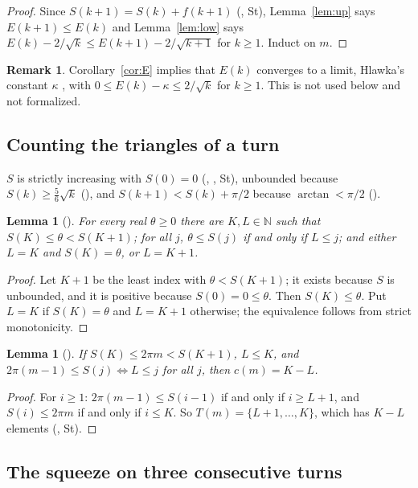 \documentclass[11pt]{amsart}
\theoremstyle{plain}
\newtheorem{lemma}[theorem]{Lemma}
\theoremstyle{definition}
\newtheorem{remark}[theorem]{Remark}
\newcommand{\N}{\mathbb{N}}
\begin{document}
\begin{proof}
Since $S(k+1)=S(k)+f(k+1)$ (, St), Lemma~\ref{lem:up} says $E(k+1)\le E(k)$ and Lemma~\ref{lem:low} says $E(k)-2/\sqrt k\le E(k+1)-2/\sqrt{k+1}$ for $k\ge1$. Induct on $m$.
\end{proof}

\begin{remark}\label{rem:hlawka}
Corollary~\ref{cor:E} implies that $E(k)$ converges to a limit, Hlawka's constant $\kappa$ \cite{Hl80}, with $0\le E(k)-\kappa\le2/\sqrt k$ for $k\ge1$. This is not used below and not formalized.
\end{remark}

\subsection{Counting the triangles of a turn}
$S$ is strictly increasing with $S(0)=0$ (, , St), unbounded because $S(k)\ge\frac56\sqrt k$ (), and $S(k+1)<S(k)+\pi/2$ because $\arctan<\pi/2$ ().

\begin{lemma}[]\label{lem:KL}
For every real $\theta\ge0$ there are $K,L\in\N$ such that $S(K)\le\theta<S(K+1)$; for all $j$, $\theta\le S(j)$ if and only if $L\le j$; and either $L=K$ and $S(K)=\theta$, or $L=K+1$.
\end{lemma}

\begin{proof}
Let $K+1$ be the least index with $\theta<S(K+1)$; it exists because $S$ is unbounded, and it is positive because $S(0)=0\le\theta$. Then $S(K)\le\theta$. Put $L=K$ if $S(K)=\theta$ and $L=K+1$ otherwise; the equivalence follows from strict monotonicity.
\end{proof}

\begin{lemma}[]\label{lem:count}
If $S(K)\le2\pi m<S(K+1)$, $L\le K$, and $2\pi(m-1)\le S(j)\Leftrightarrow L\le j$ for all $j$, then $c(m)=K-L$.
\end{lemma}

\begin{proof}
For $i\ge1$: $2\pi(m-1)\le S(i-1)$ if and only if $i\ge L+1$, and $S(i)\le2\pi m$ if and only if $i\le K$. So $T(m)=\{L+1,\dots,K\}$, which has $K-L$ elements (, St).
\end{proof}

\subsection{The squeeze on three consecutive turns}
\end{document}
